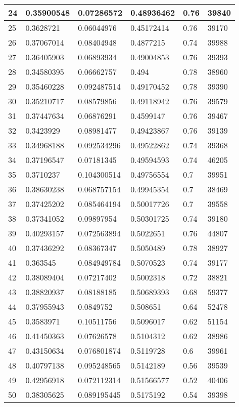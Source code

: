 \begin{longtable}{|l|l|l|l|l|l|}
24 & 0.35900548 & 0.07286572 & 0.48936462 & 0.76 & 39840 \\ \hline 
25 & 0.3628721 & 0.06044976 & 0.45172414 & 0.76 & 39170 \\ \hline 
26 & 0.37067014 & 0.08404948 & 0.4877215 & 0.74 & 39988 \\ \hline 
27 & 0.36405903 & 0.06893934 & 0.49004853 & 0.76 & 39393 \\ \hline 
28 & 0.34580395 & 0.06662757 & 0.494 & 0.78 & 38960 \\ \hline 
29 & 0.35460228 & 0.092487514 & 0.49170452 & 0.78 & 39390 \\ \hline 
30 & 0.35210717 & 0.08579856 & 0.49118942 & 0.76 & 39579 \\ \hline 
31 & 0.37447634 & 0.06876291 & 0.4599147 & 0.76 & 39467 \\ \hline 
32 & 0.3423929 & 0.08981477 & 0.49423867 & 0.76 & 39139 \\ \hline 
33 & 0.34968188 & 0.092534296 & 0.49522862 & 0.74 & 39368 \\ \hline 
34 & 0.37196547 & 0.07181345 & 0.49594593 & 0.74 & 46205 \\ \hline 
35 & 0.3710237 & 0.104300514 & 0.49756554 & 0.7 & 39951 \\ \hline 
36 & 0.38630238 & 0.068757154 & 0.49945354 & 0.7 & 38469 \\ \hline 
37 & 0.37425202 & 0.085464194 & 0.50017726 & 0.7 & 39558 \\ \hline 
38 & 0.37341052 & 0.09897954 & 0.50301725 & 0.74 & 39180 \\ \hline 
39 & 0.40293157 & 0.072563894 & 0.5022651 & 0.76 & 44807 \\ \hline 
40 & 0.37436292 & 0.08367347 & 0.5050489 & 0.78 & 38927 \\ \hline 
41 & 0.363545 & 0.084949784 & 0.5070523 & 0.74 & 39177 \\ \hline 
42 & 0.38089404 & 0.07217402 & 0.5002318 & 0.72 & 38821 \\ \hline 
43 & 0.38820937 & 0.08188185 & 0.50689393 & 0.68 & 59377 \\ \hline 
44 & 0.37955943 & 0.0849752 & 0.508651 & 0.64 & 52478 \\ \hline 
45 & 0.3583971 & 0.10511756 & 0.5096017 & 0.62 & 51154 \\ \hline 
46 & 0.41450363 & 0.07626578 & 0.5104312 & 0.62 & 38986 \\ \hline 
47 & 0.43150634 & 0.076801874 & 0.5119728 & 0.6 & 39961 \\ \hline 
48 & 0.40797138 & 0.095248565 & 0.5142189 & 0.56 & 39539 \\ \hline 
49 & 0.42956918 & 0.072112314 & 0.51566577 & 0.52 & 40406 \\ \hline 
50 & 0.38305625 & 0.089195445 & 0.5175192 & 0.54 & 39398 \\ \hline 
\end{longtable}